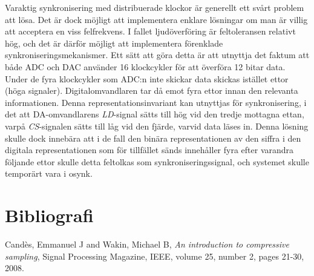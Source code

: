 \documentclass[a4paper,10pt]{article}
\begin{document}
Varaktig synkronisering med distribuerade klockor är generellt ett svårt problem 
att lösa. Det är dock möjligt att implementera enklare lösningar om man är
villig att acceptera en viss felfrekvens. I fallet ljudöverföring är 
feltoleransen relativt hög, och det är därför möjligt att implementera 
förenklade synkroniseringsmekanismer. Ett sätt att göra detta är att utnyttja 
det faktum att både ADC och DAC använder 16 klockcykler för att överföra 12 
bitar data. Under de fyra klockcykler som ADC:n inte skickar data skickas 
istället ettor (höga signaler). Digitalomvandlaren tar då emot fyra ettor innan 
den relevanta informationen. Denna representationsinvariant kan utnyttjas för
synkronisering, i det att DA-omvandlarens \emph{LD}-signal sätts till hög vid 
den tredje mottagna ettan, varpå \emph{CS}-signalen sätts till låg vid den 
fjärde, varvid data läses in. Denna lösning skulle dock innebära att i de fall
den binära representationen av den siffra i den digitala representationen som 
för tillfället sänds innehåller fyra efter varandra följande ettor skulle detta 
feltolkas som synkroniseringssignal, och systemet skulle temporärt vara i osynk.

\section{Bibliografi}

\begin{thebibliography}{hejhej}

    {Cand{\`e}s, Emmanuel J and Wakin, Michael B,
    \emph{An introduction to compressive sampling},
    Signal Processing Magazine, IEEE,
    volume 25,
    number 2,
    pages 21-30,
    2008.
}
\end{thebibliography}
\end{document}
